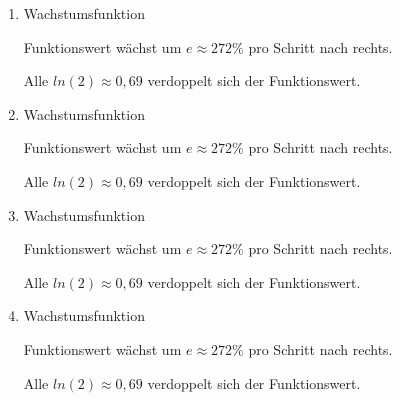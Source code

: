 \begin{Answer}[ref=eFktWZA1]
\begin{minipage}{\textwidth}
{\begin{minipage}{0.5\textwidth}
\begin{enumerate}[label=\alph*)]
                    Funktionswert wächst um \(e\approx272\%\) pro Schritt nach rechts.

                    Alle \(ln(2)\approx0,69\) verdoppelt sich der Funktionswert.
                    \item Wachstumsfunktion

                    Funktionswert wächst um \(e\approx272\%\) pro Schritt nach rechts.

                    Alle \(ln(2)\approx0,69\) verdoppelt sich der Funktionswert.
                    \item Wachstumsfunktion

                    Funktionswert wächst um \(e\approx272\%\) pro Schritt nach rechts.

                    Alle \(ln(2)\approx0,69\) verdoppelt sich der Funktionswert.
                    \item Wachstumsfunktion

                    Funktionswert wächst um \(e\approx272\%\) pro Schritt nach rechts.

                    Alle \(ln(2)\approx0,69\) verdoppelt sich der Funktionswert.
                    \item Wachstumsfunktion

                    Funktionswert wächst um \(e\approx272\%\) pro Schritt nach rechts.

                    Alle \(ln(2)\approx0,69\) verdoppelt sich der Funktionswert.
                \end{enumerate}
        \end{minipage}}%
    \end{minipage}%
\end{Answer}